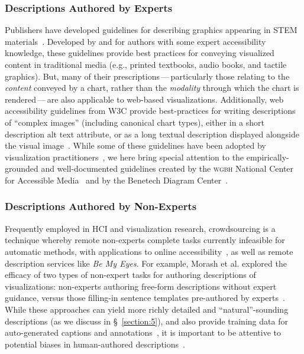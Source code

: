 \subsubsection{Descriptions Authored by Experts}
Publishers have developed guidelines for describing graphics appearing in \ac{STEM} materials~\cite{gould_effective_2008, benetech_making_nodate}.
Developed by and for authors with some expert accessibility knowledge, these guidelines provide best practices for conveying visualized content in traditional media (e.g., printed textbooks, audio books, and tactile graphics).
But, many of their prescriptions\,---\,particularly those relating to the \emph{content} conveyed by a chart, rather than the \emph{modality} through which the chart is rendered\,---\,are also applicable to web-based visualizations.
Additionally, web accessibility guidelines from \ac{W3C} provide best-practices for writing descriptions of ``complex images'' (including canonical chart types), either in a short description alt text attribute, or as a long textual description displayed alongside the visual image~\cite{w3c_wai_2019}.
While some of these guidelines have been adopted by visualization practitioners~\cite{cesal_writing_2020, schepers_why_2020, elavsky_chartability_2021, fisher_creating_2019, watson_accessible_2018, watson_accessible_2017-1, fossheim_introduction_2020}, we here bring special attention to the empirically-grounded and well-documented guidelines created by the \textsc{wgbh} National Center for Accessible Media~\cite{gould_effective_2008} and by the Benetech Diagram Center~\cite{benetech_making_nodate}.

\subsubsection{Descriptions Authored by Non-Experts}
Frequently employed in \ac{HCI} and visualization research, crowdsourcing is a technique whereby remote non-experts complete tasks currently infeasible for automatic methods, with applications to online accessibility~\cite{bigham_vizwiz_2010}, as well as remote description services like \emph{Be My Eyes}.
For example, Morash et al. explored the efficacy of two types of non-expert tasks for authoring descriptions of visualizations: non-experts authoring free-form descriptions without expert guidance, versus those filling-in sentence templates pre-authored by experts~\cite{morash_guiding_2015}.
While these approaches can yield more richly detailed and ``natural''-sounding descriptions (as we discuss in \S~\ref{section:5}), and also provide training data for auto-generated captions and annotations~\cite{qian_formative_2020, kong_extracting_2014}, it is important to be attentive to potential biases in human-authored descriptions~\cite{bennett_its_2021}.

